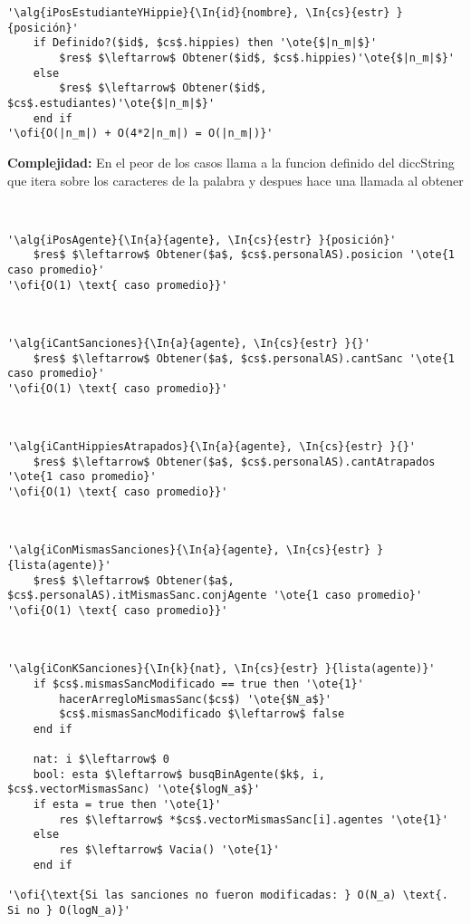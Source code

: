 \begin{lstlisting}[mathescape]
'\alg{iPosEstudianteYHippie}{\In{id}{nombre}, \In{cs}{estr} }{posición}'
	if Definido?($id$, $cs$.hippies) then '\ote{$|n_m|$}'
		$res$ $\leftarrow$ Obtener($id$, $cs$.hippies)'\ote{$|n_m|$}'
	else
		$res$ $\leftarrow$ Obtener($id$, $cs$.estudiantes)'\ote{$|n_m|$}'
	end if
'\ofi{O(|n_m|) + O(4*2|n_m|) = O(|n_m|)}'
\end{lstlisting}

\textbf{Complejidad:} En el peor de los casos llama a la funcion definido del diccString que itera sobre los caracteres de la palabra y despues hace una llamada al obtener

~


\begin{lstlisting}[mathescape]
'\alg{iPosAgente}{\In{a}{agente}, \In{cs}{estr} }{posición}'
	$res$ $\leftarrow$ Obtener($a$, $cs$.personalAS).posicion '\ote{1 caso promedio}'
'\ofi{O(1) \text{ caso promedio}}'
\end{lstlisting}

~


\begin{lstlisting}[mathescape]
'\alg{iCantSanciones}{\In{a}{agente}, \In{cs}{estr} }{}'
	$res$ $\leftarrow$ Obtener($a$, $cs$.personalAS).cantSanc '\ote{1 caso promedio}'
'\ofi{O(1) \text{ caso promedio}}'
\end{lstlisting}

~


\begin{lstlisting}[mathescape]
'\alg{iCantHippiesAtrapados}{\In{a}{agente}, \In{cs}{estr} }{}'
	$res$ $\leftarrow$ Obtener($a$, $cs$.personalAS).cantAtrapados '\ote{1 caso promedio}'
'\ofi{O(1) \text{ caso promedio}}'
\end{lstlisting}

~


\begin{lstlisting}[mathescape]
'\alg{iConMismasSanciones}{\In{a}{agente}, \In{cs}{estr} }{lista(agente)}'
	$res$ $\leftarrow$ Obtener($a$, $cs$.personalAS).itMismasSanc.conjAgente '\ote{1 caso promedio}'
'\ofi{O(1) \text{ caso promedio}}'
\end{lstlisting}

~


\begin{lstlisting}[mathescape]
'\alg{iConKSanciones}{\In{k}{nat}, \In{cs}{estr} }{lista(agente)}'
	if $cs$.mismasSancModificado == true then '\ote{1}'
		hacerArregloMismasSanc($cs$) '\ote{$N_a$}'
		$cs$.mismasSancModificado $\leftarrow$ false
	end if

	nat: i $\leftarrow$ 0
	bool: esta $\leftarrow$ busqBinAgente($k$, i, $cs$.vectorMismasSanc) '\ote{$logN_a$}'
	if esta = true then '\ote{1}'
		res $\leftarrow$ *$cs$.vectorMismasSanc[i].agentes '\ote{1}'
	else
		res $\leftarrow$ Vacia() '\ote{1}'
	end if

'\ofi{\text{Si las sanciones no fueron modificadas: } O(N_a) \text{. Si no } O(logN_a)}'
\end{lstlisting}

